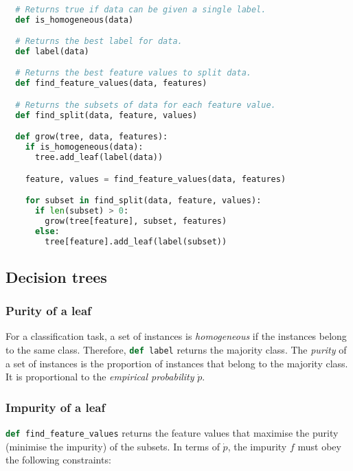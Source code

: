 \begin{alg}
  \label{algLearnFeatureTree}
  \begin{lstlisting}[language=Python]

  # Returns true if data can be given a single label.
  def is_homogeneous(data)

  # Returns the best label for data.
  def label(data)

  # Returns the best feature values to split data.
  def find_feature_values(data, features)

  # Returns the subsets of data for each feature value.
  def find_split(data, feature, values)

  def grow(tree, data, features):
    if is_homogeneous(data):
      tree.add_leaf(label(data))

    feature, values = find_feature_values(data, features)

    for subset in find_split(data, feature, values):
      if len(subset) > 0:
        grow(tree[feature], subset, features)
      else:
        tree[feature].add_leaf(label(subset))
\end{lstlisting}
\end{alg}

\subsection{Decision trees}

\subsubsection{Purity of a leaf}

For a classification task, a set of instances is \textit{homogeneous} if the
instances belong to the same class.
Therefore, \lstinline[language=Python]{def label} returns the majority class.
The \textit{purity} of a set of instances is the proportion of instances that
belong to the majority class.
It is proportional to the \textit{empirical probability} $\dot{p}$.

\subsubsection{Impurity of a leaf}

\lstinline[language=Python]{def find_feature_values} returns the feature values that maximise the purity (minimise the impurity) of the subsets.
In terms of $\dot{p}$, the impurity $f$ must obey the following constraints:

